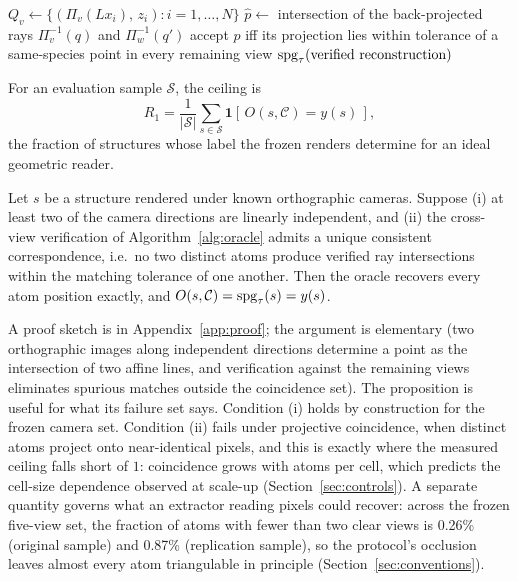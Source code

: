 \begin{algorithm}[t]
\caption{Geometric oracle $O(s, \mathcal{C})$}
\label{alg:oracle}
\begin{algorithmic}[1]
  \State $Q_v \gets \{(\Pi_v(L x_i),\, z_i) : i = 1,\dots,N\}$
\EndFor
{}
  \State $\hat{p} \gets$ intersection of the back-projected rays $\Pi_v^{-1}(q)$ and $\Pi_w^{-1}(q')$
  \State accept $\hat{p}$ iff its projection lies within tolerance of a same-species point in every
         remaining view
\EndFor
\State \Return $\mathrm{spg}_\tau(\text{verified reconstruction})$
\end{algorithmic}
\end{algorithm}

\begin{definition}
\label{def:ceiling}
For an evaluation sample $\mathcal{S}$, the ceiling is
\[
R_1 = \frac{1}{|\mathcal{S}|}\sum_{s \in \mathcal{S}} \mathbf{1}\!\left[\,O(s,\mathcal{C}) = y(s)\,\right],
\]
the fraction of structures whose label the frozen renders determine for an ideal geometric reader.
\end{definition}

\begin{proposition}
\label{prop:ident}
Let $s$ be a structure rendered under known orthographic cameras. Suppose (i) at least two of the camera
directions are linearly independent, and (ii) the cross-view verification of
Algorithm~\ref{alg:oracle} admits a unique consistent correspondence, i.e.\ no two distinct atoms produce
verified ray intersections within the matching tolerance of one another. Then the oracle recovers every
atom position exactly, and $O(s, \mathcal{C}) = \mathrm{spg}_\tau(s) = y(s)$.
\end{proposition}

A proof sketch is in Appendix~\ref{app:proof}; the argument is elementary (two orthographic images along
independent directions determine a point as the intersection of two affine lines, and verification against
the remaining views eliminates spurious matches outside the coincidence set). The proposition is useful for
what its failure set says. Condition (i) holds by construction for the frozen camera set. Condition
(ii) fails under projective coincidence, when distinct atoms project onto near-identical pixels, and this
is exactly where the measured ceiling falls short of $1$: coincidence grows with atoms per cell, which
predicts the cell-size dependence observed at scale-up (Section~\ref{sec:controls}). A separate quantity
governs what an extractor reading pixels could recover: across the frozen five-view set, the fraction of
atoms with fewer than two clear views is 0.26\% (original sample) and 0.87\% (replication sample), so the
protocol's occlusion leaves almost every atom triangulable in principle (Section~\ref{sec:conventions}).


